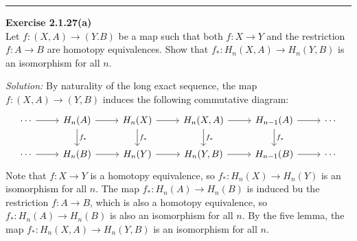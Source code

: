 \documentclass[a4paper, 12pt]{article}
\newenvironment{problem}[2][Exercise]
    { \begin{mdframed}[backgroundcolor=gray!20] \textbf{#1 #2} \\}
    {  \end{mdframed}}
\newenvironment{solution}
    {\textit{Solution:}}
    {}
\begin{document}
\noindent\rule{7in}{2.8pt}
\begin{problem}{2.1.27(a)}
Let \(f:(X,A)\rightarrow (Y.B)\) be a map such that both \(f:X\rightarrow Y\) and the restriction \(f:A\rightarrow B\) are homotopy equivalences. Show that \(f_*:H_n(X,A)\rightarrow H_n(Y,B)\) is 
an isomorphism for all \(n\).
\end{problem}
\begin{solution}
By naturality of the long exact sequence, the map \(f:(X,A)\rightarrow (Y,B)\) induces the following commutative diagram:
\[\begin{tikzcd}
	\cdots & {H_n(A)} & {H_n(X)} & {H_n(X,A)} & {H_{n-1}(A)} & \cdots \\
	\cdots & {H_n(B)} & {H_n(Y)} & {H_n(Y,B)} & {H_{n-1}(B)} & \cdots
	\arrow[from=1-1, to=1-2]
	\arrow[from=1-2, to=1-3]
	\arrow["{f_*}", from=1-2, to=2-2]
	\arrow[from=1-3, to=1-4]
	\arrow["{f_*}", from=1-3, to=2-3]
	\arrow[from=1-4, to=1-5]
	\arrow["{f_*}", from=1-4, to=2-4]
	\arrow[from=1-5, to=1-6]
	\arrow["{f_*}", from=1-5, to=2-5]
	\arrow[from=2-1, to=2-2]
	\arrow[from=2-2, to=2-3]
	\arrow[from=2-3, to=2-4]
	\arrow[from=2-4, to=2-5]
	\arrow[from=2-5, to=2-6]
\end{tikzcd}\]
Note that \(f:X\rightarrow Y\) is a homotopy equivalence, so \(f_*:H_n(X)\rightarrow H_n(Y)\) is an isomorphism for all \(n\). The map \(f_*:H_n(A)\rightarrow H_n(B)\)	is induced bu the restriction \(f:A\rightarrow B\), which 
is also a homotopy equivalence, so \(f_*:H_n(A)\rightarrow H_n(B)\) is also an isomorphism for all \(n\). By the five lemma, the map \(f_*:H_n(X,A)\rightarrow H_n(Y,B)\) is an isomorphism for all \(n\).
\end{solution}
\end{document}

